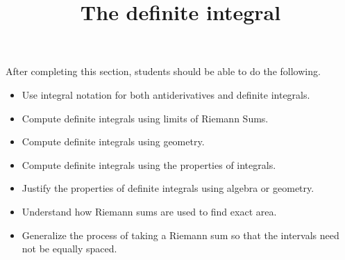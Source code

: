 \documentclass{ximera}
\title{The definite integral}
\begin{document}
\begin{abstract}
\end{abstract}

\maketitle

\begin{sectionOutcomes}

After completing this section, students should be able to do the following.

\begin{itemize}
	\item Use integral notation for both antiderivatives and definite integrals.
	\item Compute definite integrals using limits of Riemann Sums.
	\item Compute definite integrals using geometry.
	\item Compute definite integrals using the properties of integrals.
	\item Justify the properties of definite integrals using algebra or geometry.
	\item Understand how Riemann sums are used to find exact area.
	\item Generalize the process of taking a Riemann sum so that the intervals need not be equally spaced.
\end{itemize}

\end{sectionOutcomes}
\end{document}
